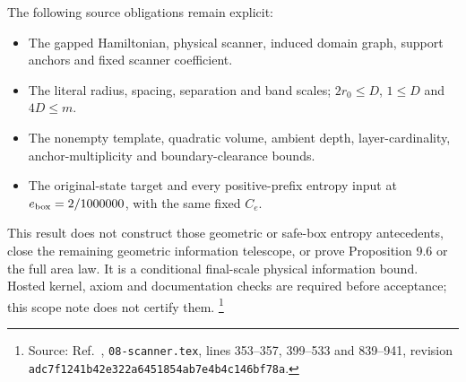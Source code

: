 \documentclass{article}
\begin{document}
The following source obligations remain explicit:
\begin{itemize}
    \item The gapped Hamiltonian, physical scanner, induced domain graph,
          support anchors and fixed scanner coefficient.
    \item The literal radius, spacing, separation and band scales;
          $2r_0\leq D$, $1\leq D$ and $4D\leq m$.
    \item The nonempty template, quadratic volume, ambient depth,
          layer-cardinality, anchor-multiplicity and boundary-clearance bounds.
    \item The original-state target and every positive-prefix entropy
          input at $e_{\rm box}=2/1000000$, with the same fixed $C_e$.
\end{itemize}
This result does not construct those geometric or safe-box entropy
antecedents, close the remaining geometric information telescope, or prove
Proposition 9.6 or the full area law.  It is a conditional final-scale
physical information bound.  Hosted kernel, axiom and documentation checks
are required before acceptance; this scope note does not certify them.
\footnote{Source: Ref.~\cite{OpenAI2026AreaLaw}, \texttt{08-scanner.tex},
    lines 353--357, 399--533 and 839--941, revision
    \texttt{adc7f1241b42e322a6451854ab7e4b4c146bf78a}.}



\end{document}
